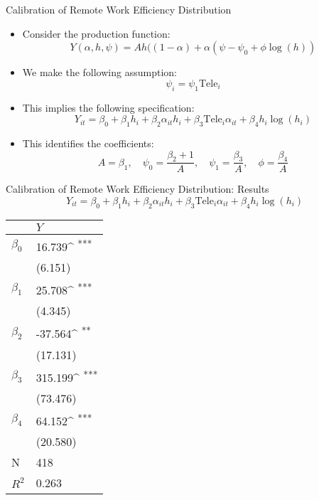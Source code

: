 \documentclass[aspectratio=1610]{beamer}
\newcommand{\sym}[1]{\ifmmode ^{\text{#1}} \else \textsuperscript{#1}\fi}
\begin{document}
\begin{frame}[label=appendix_calibration_psi_details]{Calibration of Remote Work Efficiency Distribution}
    
    \begin{itemize}

        \item Consider the production function:
        $$Y(\alpha, h, \psi) = A h ((1-\alpha)  + \alpha (\psi - \psi_0 + \phi \log(h))$$
    
        \item We make the following assumption:
        $$\psi_i = \psi_1 \text{Tele}_i$$
        \item This implies the following specification:
        $$
 Y_{it} = \beta_0 + \beta_1 h_{i} + \beta_2 \alpha_{it} h_{i} + \beta_3 \text{Tele}_i \alpha_{it} + \beta_4 h_{i} \log(h_i)
        $$
        \item This identifies the coefficients:
        $$A = \beta_1, \quad \psi_0 = \frac{\beta_2+1}{A}, \quad \psi_1 =\frac{\beta_3}{A}, \quad \phi = \frac{\beta_4}{A}$$
    \end{itemize}
    \hyperlink{calibration_overview}{}
\end{frame}

\begin{frame}{Calibration of Remote Work Efficiency Distribution: Results}
    $$
    Y_{it} = \beta_0 + \beta_1 h_{i} + \beta_2 \alpha_{it} h_{i} + \beta_3 \text{Tele}_i \alpha_{it} + \beta_4 h_{i} \log(h_i)
    $$
    \begin{table}
        \begin{center}
            \footnotesize
        \begin{tabular}{ll}
        \hline
        \hline
                         & $Y$       \\
        \hline
        $\beta_0$        & 16.739\sym{***}   \\
                         & (6.151)     \\
        $\beta_1$            & 25.708\sym{***}   \\
                         & (4.345)     \\
        $\beta_2$      & -37.564\sym{**}   \\
                         & (17.131)    \\
        $\beta_3$ & 315.199\sym{***}  \\
                         & (73.476)    \\
        $\beta_4$ & 64.152\sym{***}   \\
                         & (20.580)    \\
        \hline
        N                & 418         \\
        $R^2$          & 0.263       \\
        \hline
        \hline
        \end{tabular}
        \end{center}
        \end{table}
\end{frame}
\end{document}
